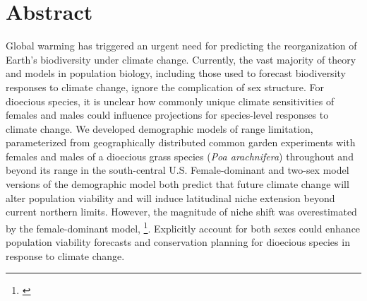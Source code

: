 \documentclass[12pt]{article}
\newcommand{\tom}[2]{{\color{red}{#1}}\footnote{\textit{\color{red}{#2}}}}
\begin{document}
\section*{Abstract}
Global warming has triggered an urgent need for predicting the reorganization of Earth's biodiversity under climate change.
Currently, the vast majority of theory and models in population biology, including those used to forecast biodiversity responses to climate change, ignore the complication of sex structure. 
For dioecious species, it is unclear how commonly unique climate sensitivities of females and males could influence projections for species-level responses to climate change. 
We developed demographic models of range limitation, parameterized from geographically distributed common garden experiments with females and males of a dioecious grass species (\textit{Poa arachnifera}) throughout and beyond its range in the south-central U.S. 
Female-dominant and two-sex model versions of the demographic model both predict that future climate change will alter population viability and will induce latitudinal niche extension beyond current northern limits.
However, the magnitude of niche shift was overestimated by the female-dominant model, \tom{because females have broader temperature tolerance than males and become mate-limited under female-biased sex ratios}{Not sure yet if this is true but we need some sort of biological rationale to accompany this result.}.
Explicitly account for both sexes could enhance population viability forecasts and conservation planning for dioecious species in response to climate change.

\newpage
\end{document}
